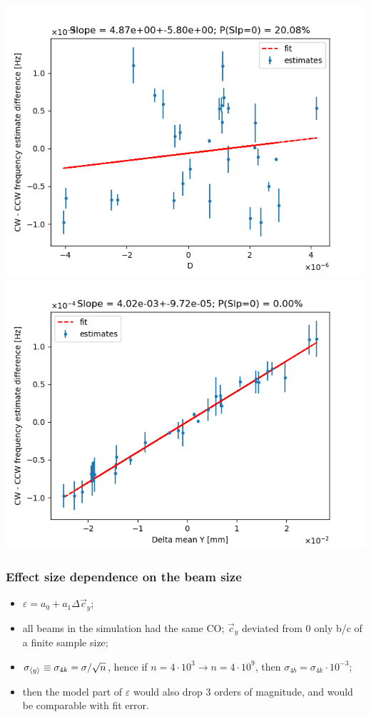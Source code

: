 \documentclass{beamer}
\begin{document}
\begin{frame}
  \includegraphics[height=.5\paperheight]{img/spin_axis_motion/multiple/freq_estimates_vs_centroid_diff_D}\\
  \vspace*{-.2cm}
  \includegraphics[height=.5\paperheight]{img/spin_axis_motion/multiple/freq_estimates_vs_centroid_diff_Y}
\end{frame}
\begin{frame}
  \frametitle{Effect size dependence on the beam size}
  \begin{itemize}
  \item $\varepsilon = a_0 + a_1\Delta \vec c_y$;
  \item all beams in the simulation had the same CO; $\vec c_y$ deviated from 0 only b/c of a finite sample size;
  \item $\sigma_{\avg{y}}\equiv \sigma_{4k} = \sigma/\sqrt{n}$, hence if $n = 4\cdot 10^3 \rightarrow n=4\cdot 10^9$, then $\sigma_{4b} = \sigma_{4k}\cdot 10^{-3}$;
  \item then the model part of $\varepsilon$ would also drop 3 orders of magnitude, and would be comparable with fit error.
  \end{itemize}
\end{frame}
\end{document}
